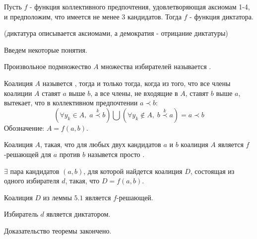 \begin{theorem}\label{cha:5/the:1}
	Пусть $f$ - функция коллективного предпочтения, удовлетворяющая аксиомам 1-4, и предположим, что имеется не менее 3 кандидатов. Тогда $f$ - функция диктатора.

	(диктатура описывается аксиомами, а демократия - отрицание диктатуры)
\end{theorem}
\begin{Proof}
	Введем некоторые понятия.

	Произвольное подмножество $A$ множества избирателей называется .

	\begin{definition}\label{cha:5/def:1}
		Коалиция $A$ назывется , тогда и только тогда, когда из того, что все члены коалиции $A$ ставят $a$ выше $b$, а все члены, не входящие в $A$, ставят $b$ выше $a$, вытекает, что в коллективном предпочтении $a \prec b$:
		$$(\forall y_k \in A, \; a \overset{k}{\prec} b) \bigcup (\forall y_k \not \in A, \; b \overset{k}{\prec}a) = a \prec b$$
		Обозначение: $A = f(a, b)$.
	\end{definition}

	Коалиция $A$, такая, что для любых двух кандидатов $a$ и $b$ коалиция $A$ является $f$-решающей для $a$ против $b$ назывется просто .

	\begin{lemma}[]\label{cha:5/lemma:1}
		$\exists$ пара кандидатов $(a, b)$, для которой найдется коалиция $D$, состоящая из одного избирателя $d$, такая, что $D = f(a, b)$.
	\end{lemma}

	\begin{lemma}[]\label{cha:5/lemma:2}
		Коалиция $D$ из леммы $5.1$ является $f$-решающей.
	\end{lemma}

	\begin{lemma}[]\label{cha:5/lemma:3}
		Избиратель $d$ является диктатором.
	\end{lemma}

	Доказательство теоремы закончено.
\end{Proof}

















